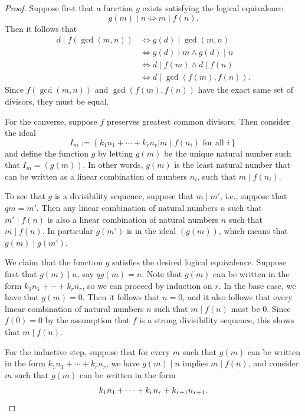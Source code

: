 \begin{proof}
  Suppose first that a function $g$ exists satisfying the logical equivalence
  \begin{equation*}
    g(m)\mid n \Leftrightarrow m\mid f(n).
  \end{equation*}
  Then it follows that
  \begin{align*}
    d\mid f(\gcd(m,n)) & \Leftrightarrow g(d)\mid \gcd(m,n) \\
                       & \Leftrightarrow g(d)\mid m \land g(d)\mid n \\
                       & \Leftrightarrow d\mid f(m) \land d\mid f(n) \\
                       & \Leftrightarrow d\mid \gcd(f(m),f(n)).
  \end{align*}
  Since $f(\gcd(m,n))$ and $\gcd(f(m),f(n))$ have the exact same set of divisors, they must be equal.
  
  For the converse, suppose $f$ preserves greatest common divisors. Then consider the ideal
  \begin{equation*}
    I_m := \left\{ k_1n_1+\cdots+ k_rn_r \mathbin{\big|} m\mid f(n_i) \text{ for all } i \right\}
  \end{equation*}
  and define the function $g$ by letting $g(m)$ be the unique natural number such that $I_m=(g(m))$. In other words, $g(m)$ is the least natural number that can be written as a linear combination of numbers $n_i$, such that $m\mid f(n_i)$.

  To see that $g$ is a divisibility sequence, suppose that $m\mid m'$, i.e., suppose that $qm=m'$. Then any linear combination of natural numbers $n$ such that $m'\mid f(n)$ is also a linear combination of natural numbers $n$ such that $m\mid f(n)$. In particular $g(m')$ is in the ideal $(g(m))$, which means that $g(m)\mid g(m')$.

  We claim that the function $g$ satisfies the desired logical equivalence. Suppose first that $g(m)\mid n$, say $qg(m)=n$. Note that $g(m)$ can be written in the form $k_1n_1+\cdots+ k_rn_r$, so we can proceed by induction on $r$. In the base case, we have that $g(m)=0$. Then it follows that $n=0$, and it also follows that every linear combination of natural numbers $n$ such that $m\mid f(n)$ must be $0$. Since $f(0)=0$ by the assumption that $f$ is a strong divisibility sequence, this shows that $m\mid f(n)$.

  For the inductive step, suppose that for every $m$ such that $g(m)$ can be written in the form $k_1n_1+\cdots+ k_rn_r$, we have $g(m)\mid n$ implies $m\mid f(n)$, and consider $m$ such that $g(m)$ can be written in the form
  \begin{equation*}
    k_1n_1+\cdots+ k_rn_r + k_{r+1}n_{r+1}.\qedhere
  \end{equation*}
\end{proof}

